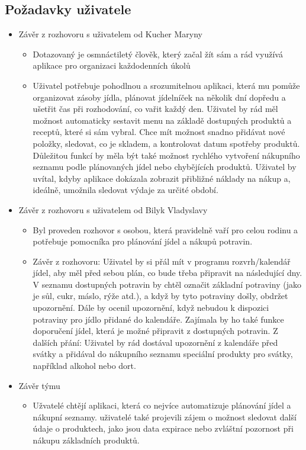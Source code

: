 \documentclass[a4paper,12pt]{article}
\begin{document}
\subsection*{Požadavky uživatele}
\begin{itemize}
    \item Závěr z rozhovoru s uživatelem od Kucher Maryny
    \begin{itemize}
        \item Dotazovaný je osmnáctiletý člověk, který začal žít sám a rád využívá aplikace pro organizaci každodenních úkolů
        \item Uživatel potřebuje pohodlnou a srozumitelnou aplikaci, která mu pomůže organizovat zásoby jídla, plánovat jídelníček na několik dní dopředu a ušetřit čas při rozhodování, co vařit každý den.
        Uživatel by rád měl možnost automaticky sestavit menu na základě dostupných produktů a receptů, které si sám vybral. Chce mít možnost snadno přidávat nové položky, sledovat, co je skladem, a kontrolovat datum spotřeby produktů.
        Důležitou funkcí by měla být také možnost rychlého vytvoření nákupního seznamu podle plánovaných jídel nebo chybějících produktů. Uživatel by uvítal, kdyby aplikace dokázala zobrazit přibližné náklady na nákup a, ideálně, umožnila sledovat výdaje za určité období.
    \end{itemize}
    \item Závěr z rozhovoru s uživatelem od Bilyk Vladyslavy
    \begin{itemize}
        \item Byl proveden rozhovor s osobou, která pravidelně vaří pro celou rodinu a potřebuje pomocníka pro plánování jídel a nákupů potravin.
        \item Závěr z rozhovoru: Uživatel by si přál mít v programu rozvrh/kalendář jídel, aby měl před sebou plán, co bude třeba připravit na následující dny. V seznamu dostupných potravin by chtěl označit základní potraviny (jako je sůl, cukr, máslo, rýže atd.), a když by tyto potraviny došly, obdržet upozornění. Dále by ocenil upozornění, když nebudou k dispozici potraviny pro jídlo přidané do kalendáře. Zajímala by ho také funkce doporučení jídel, která je možné připravit z dostupných potravin. Z dalších přání: Uživatel by rád dostával upozornění z kalendáře před svátky a přidával do nákupního seznamu speciální produkty pro svátky, například alkohol nebo dort.
    \end{itemize}
    \item Závěr týmu
    \begin{itemize}
        \item Užvatelé chtějí aplikaci, která co nejvíce automatizuje plánování jídel a nákupní seznamy. uživatelé také projevili zájem o možnost sledovat další údaje o produktech, jako jsou data expirace nebo zvláštní pozornost při nákupu základních produktů.
    \end{itemize}
\end{itemize}
\end{document}
